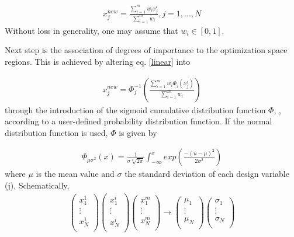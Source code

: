 \begin{eqnarray}
   x_j^{new} = \frac{\sum_{i=1}^{m}w_i x_j^i}{\sum_{i=1}^{m}w_i }, j=1,...,N 
   \label{linear} 
\end{eqnarray}
Without loss in generality, one may assume that $w_i \in [0,1]$. 

Next step is the association of degrees of importance to the optimization space regions. This is achieved by altering eq. \ref{linear} into

\begin{eqnarray}
   x_j^{new} = \Phi _j^{-1} (\frac{\sum_{i=1}^{m}w_i \Phi _j(x_j^i)}{\sum_{i=1}^{m}w_i }) 
   \label{non-linear} 
\end{eqnarray}
through the introduction of the sigmoid cumulative distribution function $\Phi$,  \cite{Kiemele}, according to a user-defined probability distribution function. If the normal distribution function is used, $\Phi$ is given by

\begin{eqnarray}
   \Phi _{\mu \sigma ^2} (x)= \frac{1}{\sigma\sqrt[2]{2\pi}}\int _{-\infty}^x exp(\frac{-(u-\mu)^2}{2 \sigma^2}) 
   \label{cdf} 
\end{eqnarray}
where $\mu$ is the mean value and $\sigma$ the standard deviation of each design variable (j). Schematically,
\begin{eqnarray}
		\left( {\begin{array}{c}
 		x_1^1  \\
 		\vdots  \\
 		x_N^1	\\
 		\end{array} } \right) 
 		\left( {\begin{array}{c}
 		x_1^i  \\
 		\vdots  \\
 		x_N^i	\\
 		\end{array} } \right)
 		\left( {\begin{array}{c}
 		x_1^m  \\
 		\vdots  \\
 		x_N^m	\\
 		\end{array} } \right) \rightarrow
		\left( {\begin{array}{c}
 		\mu _1  \\
 		\vdots  \\
 		\mu _N  \\
 		\end{array} } \right)
		\left( {\begin{array}{c}
 		\sigma _1  \\
 		\vdots  \\
 		\sigma _N  \\
 		\end{array} } \right)
   \label{cdf-matrix} 
\end{eqnarray}


